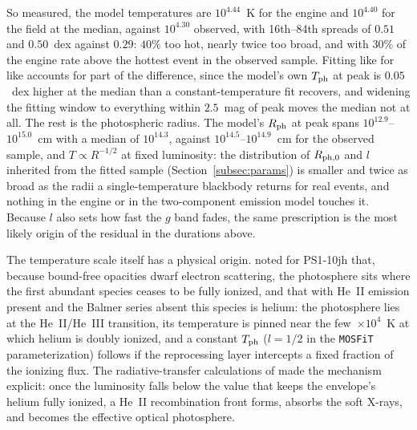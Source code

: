 \documentclass[twocolumn,pdftex]{aastex701}
\newcommand{\mosfit}{{\tt MOSFiT}\xspace}
\begin{document}
So measured, the model temperatures are $10^{4.44}$~K for the engine and $10^{4.40}$ for the field at the median, against $10^{4.30}$ observed, with 16th--84th spreads of $0.51$ and $0.50$~dex against $0.29$: $40\%$ too hot, nearly twice too broad, and with $30\%$ of the engine rate above the hottest event in the observed sample. Fitting like for like accounts for part of the difference, since the model's own $T_{\rm ph}$ at peak is $0.05$~dex higher at the median than a constant-temperature fit recovers, and widening the fitting window to everything within $2.5$~mag of peak moves the median not at all. The rest is the photospheric radius. The model's $R_{\rm ph}$ at peak spans $10^{12.9}$--$10^{15.0}$~cm with a median of $10^{14.3}$, against $10^{14.5}$--$10^{14.9}$~cm for the observed sample, and $T \propto R^{-1/2}$ at fixed luminosity: the distribution of $R_{\rm ph,0}$ and $l$ inherited from the fitted sample (Section~\ref{subsec:params}) is smaller and twice as broad as the radii a single-temperature blackbody returns for real events, and nothing in the engine or in the two-component emission model touches it. Because $l$ also sets how fast the $g$ band fades, the same prescription is the most likely origin of the residual in the durations above.

The temperature scale itself has a physical origin. \citet{Guillochon:2014a} noted for PS1-10jh that, because bound-free opacities dwarf electron scattering, the photosphere sits where the first abundant species ceases to be fully ionized, and that with He~II emission present and the Balmer series absent this species is helium: the photosphere lies at the He~II/He~III transition, its temperature is pinned near the few~$\times 10^{4}$~K at which helium is doubly ionized, and a constant $T_{\rm ph}$ ($l = 1/2$ in the \mosfit parameterization) follows if the reprocessing layer intercepts a fixed fraction of the ionizing flux. The radiative-transfer calculations of \citet{Roth:2016a} made the mechanism explicit: once the luminosity falls below the value that keeps the envelope's helium fully ionized, a He~II recombination front forms, absorbs the soft X-rays, and becomes the effective optical photosphere.
\end{document}
